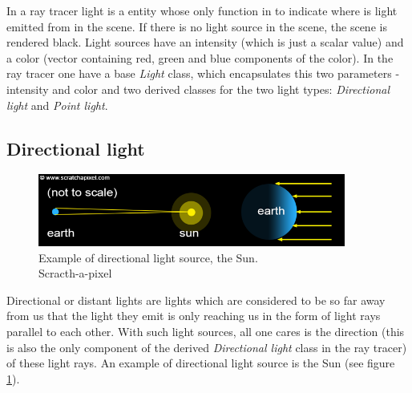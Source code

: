 \documentclass{article}
\begin{document}
\vspace*{\baselineskip}

In a ray tracer light is a entity whose only function in to indicate where is light emitted from in the scene. If there is no light source in the scene, the scene is rendered black. Light sources have an intensity (which is just a scalar value) and a color (vector containing red, green and blue components of the color). In the ray tracer one have a base \textit{Light} class, which encapsulates this two parameters - intensity and color and two derived classes for the two light types: \textit{Directional light} and \textit{Point light}.

\subsection*{Directional light}
\begin{figure}[h]
	\centering
	\includegraphics[width=0.9\textwidth]{directional_light}
	\caption{Example of directional light source, the Sun. \\ Scracth-a-pixel}
	\label{fig:sun}
\end{figure}

Directional or distant lights are lights which are considered to be so far away from us that the light they emit is only reaching us in the form of light rays parallel to each other. With such light sources, all one cares is the direction (this is also the only component of the derived \textit{Directional light} class in the ray tracer) of these light rays. An example of directional light source is the Sun (see figure \ref{fig:sun}). \cite{lights}
\end{document}
